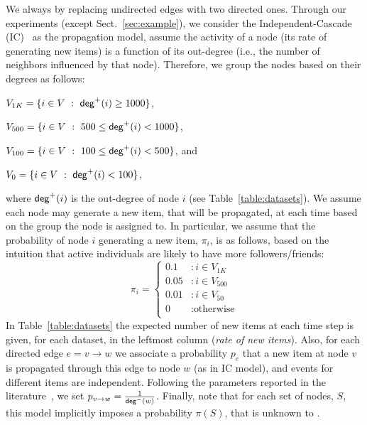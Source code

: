 We always  by replacing undirected edges with two directed ones. Through our experiments (except Sect.~\ref{sec:example}), we consider the Independent-Cascade (IC)~\cite{Kempe2003} as the propagation model, assume the activity of a node (its rate of generating new items) is a function of its out-degree (i.e., the number of neighbors influenced by that node). Therefore, we group the nodes based on their degrees as follows:
\begin{itemize*}
 \item $V_{1K} = \{i\in V ~:~ \mathsf{deg}^+(i) \geq 1000\}$,
 \item $V_{500}  = \{i\in V ~:~ 500\leq \mathsf{deg}^+(i) < 1000\}$,
 \item $V_{100}  = \{i\in V ~:~ 100\leq \mathsf{deg}^+(i) < 500\}$, and
 \item $V_{0}    = \{i\in V ~:~ \mathsf{deg}^+(i) < 100\}$,
\end{itemize*}
where $\mathsf{deg}^+(i)$ is the out-degree of node $i$ (see Table~\ref{table:datasets}).
We assume each node may generate a new item, that will be propagated, at each
time based on the group the node is assigned to. In particular, we assume that
the probability of  node $i$ generating a new item, $\pi_i$, is as follows,
based on the intuition that active individuals are  likely to have more
followers/friends:
$$
   \pi_i = \left\{
     \begin{array}{ll}
       0.1 &: i \in V_{1K}\\
       0.05 &: i \in V_{500} \\
       0.01 &: i \in V_{50} \\
       0 & : \text{otherwise} \\
     \end{array}
   \right.
$$
 In Table~\ref{table:datasets} the expected number of new items at each time
 step is given, for each dataset, in the leftmost column (\emph{rate of new
 items}). Also, for each directed edge $e=v\rightarrow w$ we associate  a probability
$p_e$ that a new item at node $v$ is propagated through this edge to node $w$ (as in IC model),
and events for different items are independent. Following the parameters
reported in the
literature~\cite{Kempe2003,Chen2009,Chen2010,jung2011irie,tang2014influence}, we
set $p_{v\rightarrow w} = \frac{1}{\mathsf{deg}^-(w)}$. Finally, note that for each set of nodes, $S$, this model implicitly imposes a probability $\pi(S)$, that is unknown to \algonameapx.


